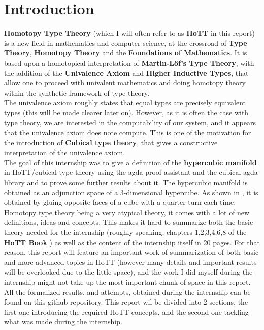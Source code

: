 \documentclass{report}
\begin{document}
\section{Introduction}
\textbf{Homotopy Type Theory} (which I will often refer to as \textbf{HoTT} in this report) is a new field in mathematics and computer science, at the crossroad of \textbf{Type Theory}, \textbf{Homotopy Theory} and the \textbf{Foundations of Mathematics}. It is based upon a homotopical interpretation of \textbf{Martin-Löf's Type Theory}, with the addition of the \textbf{Univalence Axiom} and \textbf{Higher Inductive Types}, that allow one to proceed with univalent mathematics and doing homotopy theory within the synthetic framework of type theory.\\
The univalence axiom roughly states that equal types are precisely equivalent types (this will be made clearer later on). However, as it is often the case with type theory, we are interested in the computability of our system, and it appears that the univalence axiom does note compute. This is one of the motivation for the introduction of \textbf{Cubical type theory}, that gives a constructive interpretation of the univalence axiom.\\
The goal of this internship was to give a definition of the \textbf{hypercubic manifold} in HoTT/cubical type theory using the agda proof assistant and the cubical agda library \cite{cubicalagda} and to prove some further results about it. The hypercubic manifold \cite{hypercubic} is obtained as an adjunction space of a 3-dimensional hypercube. As shown in \cite{hypercubic}, it is obtained by gluing opposite faces of a cube with a quarter turn each time.\\
Homotopy type theory being a very atypical theory, it comes with a lot of new definitions, ideas and concepts. This makes it hard to summarize both the basic theory needed for the internship (roughly speaking, chapters 1,2,3,4,6,8 of the \textbf{HoTT Book} \cite{hott}) as well as the content of the internship itself in 20 pages. For that reason, this report will feature an important work of summarization of both basic and more advanced topics in HoTT (however many details and important results will be overlooked due to the little space), and the work I did myself during the internship might not take up the most important chunk of space in this report. All the formalized results, and attempts, obtained during the internship can be found on this github repository. This report wil be divided into 2 sections, the first one introducing the required HoTT concepts, and the second one tackling what was made during the internship.
\end{document}
